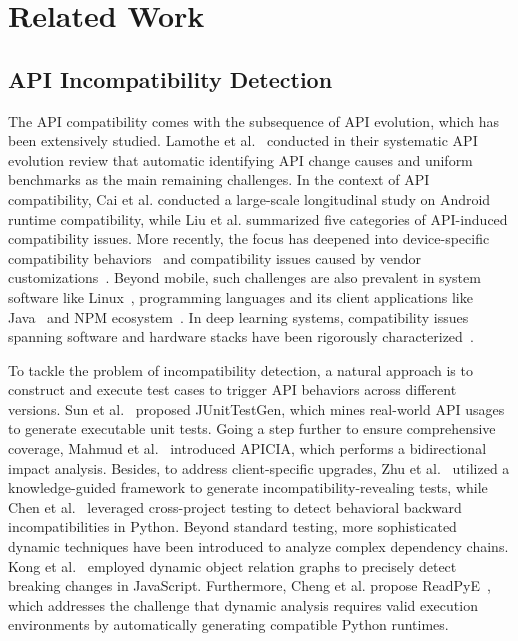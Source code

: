 \section{Related Work}

\subsection{API Incompatibility Detection}


The API compatibility comes with the subsequence of API evolution, which has been extensively studied. Lamothe et al.~\cite{lamothe2021systematic} conducted in their systematic API evolution review that automatic identifying API change causes and uniform benchmarks as the main remaining challenges. In the context of API compatibility, Cai et al.\cite{cai2019large} conducted a large-scale longitudinal study on Android runtime compatibility, while Liu et al.\cite{liu2022automatically} summarized five categories of API-induced compatibility issues. More recently, the focus has deepened into device-specific compatibility behaviors~\cite{dong2024same} and compatibility issues caused by vendor customizations~\cite{chen2024demystifying}. Beyond mobile, such challenges are also prevalent in system software like Linux~\cite{tsai2016study}, programming languages and its client applications like Java~\cite{jayasuriya2024understanding} and NPM ecosystem~\cite{kong2025toward}. In deep learning systems, compatibility issues spanning software and hardware stacks have been rigorously characterized~\cite{wang2023compatibility}. 

To tackle the problem of incompatibility detection, a natural approach is to construct and execute test cases to trigger API behaviors across different versions. Sun et al.~\cite{sun2022mining} proposed JUnitTestGen, which mines real-world API usages to generate executable unit tests. Going a step further to ensure comprehensive coverage, Mahmud et al.~\cite{mahmud2024apicia} introduced APICIA, which performs a bidirectional impact analysis. Besides, to address client-specific upgrades, Zhu et al.~\cite{zhu2023client} utilized a knowledge-guided framework to generate incompatibility-revealing tests, while Chen et al.~\cite{chen2020taming} leveraged cross-project testing to detect behavioral backward incompatibilities in Python. Beyond standard testing, more sophisticated dynamic techniques have been introduced to analyze complex dependency chains. Kong et al.~\cite{kong2025more} employed dynamic object relation graphs to precisely detect breaking changes in JavaScript. Furthermore, Cheng et al. propose ReadPyE~\cite{cheng2023revisiting}, which addresses the challenge that dynamic analysis requires valid execution environments by automatically generating compatible Python runtimes.

